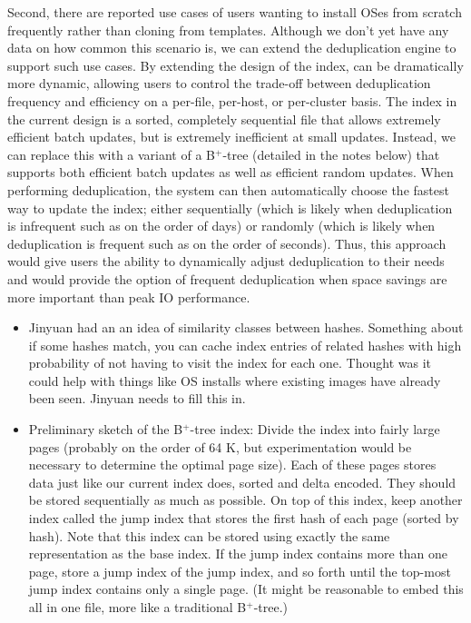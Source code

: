 {Second, there are reported use cases of users wanting to install
OSes from scratch frequently rather than cloning from templates.
Although we don't yet have any data on how common this scenario is,
we can extend the deduplication engine to support such use cases.
By extending the design of the index, \DeDe can be dramatically more
dynamic, allowing users to control the trade-off between
deduplication frequency and efficiency on a per-file, per-host, or
per-cluster basis.  The index in the current design is a sorted,
completely sequential file that allows extremely efficient batch
updates, but is extremely inefficient at small updates.  Instead, we
can replace this with a variant of a B$^+$-tree (detailed in the
notes below) that supports both efficient batch updates as well as
efficient random updates.  When performing deduplication, the system
can then automatically choose the fastest way to update the index;
either sequentially (which is likely when deduplication is
infrequent such as on the order of days) or randomly (which is
likely when deduplication is frequent such as on the order of
seconds).  Thus, this approach would give users the ability to
dynamically adjust deduplication to their needs and would provide
the option of frequent deduplication when space savings are more
important than peak IO performance.

\begin{itemize}
\item{Jinyuan had an an idea of similarity classes between
  hashes. Something about if some hashes match, you can cache
  index entries of related hashes with high probability of not
  having to visit the index for each one. Thought was it could
  help with things like OS installs where existing images have
  already been seen. Jinyuan needs to fill this in.}
\item Preliminary sketch of the B$^+$-tree index: Divide the index
  into fairly large pages (probably on the order of 64 K, but
  experimentation would be necessary to determine the optimal page
  size).  Each of these pages stores data just like our current
  index does, sorted and delta encoded.  They should be stored
  sequentially as much as possible.  On top of this index, keep
  another index called the jump index that stores the first hash of
  each page (sorted by hash).  Note that this index can be stored
  using exactly the same representation as the base index.  If the
  jump index contains more than one page, store a jump index of the
  jump index, and so forth until the top-most jump index contains
  only a single page.  (It might be reasonable to embed this all in
  one file, more like a traditional B$^+$-tree.)


\end{itemize}}
